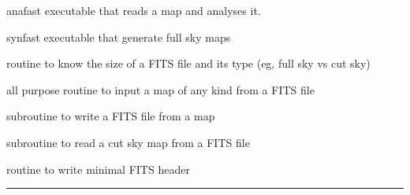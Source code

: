 \begin{related}
  \begin{sulist}{} %
  \item[anafast] executable that reads a \healpix map and analyses it. 
  \item[synfast] executable that generate full sky \healpix maps
  \item[\htmlref{getsize\_fits}{sub:getsize_fits}] routine to know the size of a FITS file and its type (eg, full sky vs cut sky)
  \item[\htmlref{input\_map}{sub:input_map}] all purpose routine to input a map of any kind from a FITS file
  \item[\htmlref{output\_map}{sub:output_map}] subroutine to write a FITS file from a \healpix map
  \item[\htmlref{read\_fits\_cut4}{sub:read_fits_cut4}] subroutine to read a \healpix cut sky map from a FITS file
  \item[\htmlref{write\_minimal\_header}{sub:write_minimal_header}] routine to write minimal FITS header
  \end{sulist}
\end{related}

\rule{\hsize}{2mm}

\newpage
